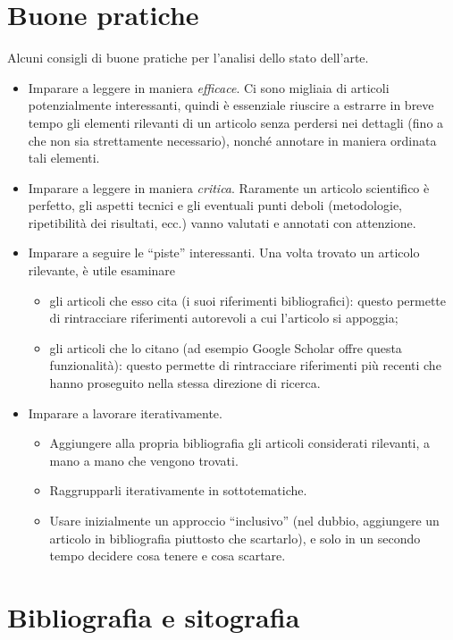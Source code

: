 \section{Buone pratiche}

Alcuni consigli di buone pratiche per l'analisi dello stato dell'arte.
\begin{itemize}
\item Imparare a leggere in maniera {\em efficace}. Ci sono migliaia di articoli potenzialmente interessanti, quindi \`e essenziale riuscire a estrarre in breve tempo gli elementi rilevanti di un articolo senza perdersi nei dettagli (fino a che non sia strettamente necessario), nonch\'e annotare in maniera ordinata tali elementi.
\item Imparare a leggere in maniera {\em critica}. Raramente un articolo scientifico \`e perfetto, gli aspetti tecnici e gli eventuali punti deboli (metodologie, ripetibilit\`a dei risultati, ecc.) vanno valutati e annotati con attenzione.
\item Imparare a seguire le ``piste'' interessanti. Una volta trovato un articolo rilevante, \`e utile esaminare
\begin{itemize}
\item gli articoli che esso cita (i suoi riferimenti bibliografici): questo permette di rintracciare riferimenti autorevoli a cui l'articolo si appoggia;
\item gli articoli che lo citano (ad esempio Google Scholar offre questa funzionalit\`a): questo permette di rintracciare riferimenti pi\`u recenti che hanno proseguito nella stessa direzione di ricerca.
\end{itemize}
\item Imparare a lavorare iterativamente.
\begin{itemize}
\item Aggiungere alla propria bibliografia gli articoli considerati rilevanti, a mano a mano che vengono trovati.
\item Raggrupparli iterativamente in sottotematiche.
\item Usare inizialmente un approccio ``inclusivo'' (nel dubbio, aggiungere un articolo in bibliografia piuttosto che scartarlo), e solo in un secondo tempo decidere cosa tenere e cosa scartare.
\end{itemize}
\end{itemize}



\section{Bibliografia e sitografia}
\label{sec:biblio}

